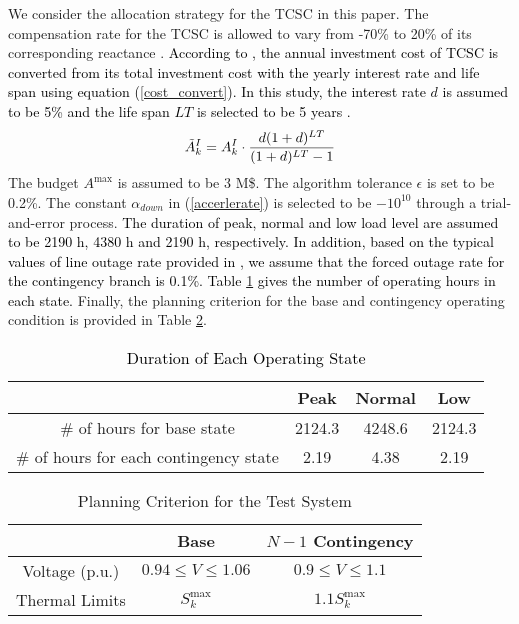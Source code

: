 \documentclass[journal]{IEEEtran}
\begin{document}
We consider the allocation strategy for the TCSC in this paper. The compensation rate for the TCSC is allowed to vary from -70\% to 20\% of its corresponding reactance \cite{mybibb:TCSC_cost_recovery}. \textcolor{black}{According to \cite{mybibb:GA_FACT_market}, the annual investment cost of TCSC is converted from its total investment cost with the yearly interest rate and life span using equation (\ref{cost_convert}). In this study, the interest rate $d$ is assumed to be 5\% and the life span $LT$ is selected to be 5 years \cite{mybibb:TCSC_cost_recovery}.} 
\begin{equation}
\textcolor{black}{\tilde{A}^I_k={A}^I_k \cdot \frac{d(1+d)^{LT}}{(1+d)^{LT}-1}}  \label{cost_convert}
\end{equation}    
The budget $A^{\max}$ is assumed to be 3 M\$. The algorithm tolerance $\epsilon$ is set to be 0.2\%. The constant $\alpha_{down}$ in (\ref{accerlerate}) is selected to be $-10^{10}$ through a trial-and-error process. \textcolor{black}{The duration of peak, normal and low load level are assumed to be 2190 h, 4380 h and 2190 h, respectively. In addition, based on the typical values of line outage rate provided in \cite{mybibb:force_outage_1979}, we assume that the forced outage rate for the contingency branch is 0.1\%. Table \ref{duration} gives the number of operating hours in each state.} Finally, the planning criterion for the base and contingency operating condition is provided in Table \ref{criterion}. 
\begin{table}[!htb]
	\centering
	\caption{\textcolor{black}{Duration of Each Operating State}}
	\label{duration}
	\begin{tabular}{c c c c}
		\hline
		&Peak&Normal&Low  \\
		\hline
		\# of hours for base state&2124.3&4248.6&2124.3   \\
		\hline
		\# of hours for each contingency state&2.19&4.38&2.19   \\
		\hline   
	\end{tabular}
\end{table}

\begin{table}[!htb]
	\centering
	\caption{Planning Criterion for the Test System}
	\label{criterion}
	\begin{tabular}{c c c }
		\hline
		&Base&$N-1$ Contingency  \\
		\hline
		Voltage (p.u.)&$0.94 \le V \le 1.06$& $0.9 \le V \le 1.1$  \\
		\hline 
		Thermal Limits &$S^{\max}_k$&$1.1S^{\max}_k$   \\
		\hline
	\end{tabular}
\end{table}
\end{document}
